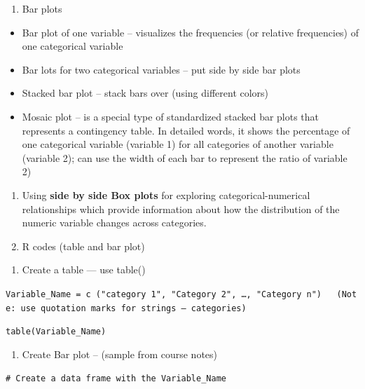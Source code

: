 \documentclass[
]{book}
\providecommand{\tightlist}{%
  \setlength{\itemsep}{0pt}\setlength{\parskip}{0pt}}
\begin{document}
\begin{enumerate}
\def\labelenumi{\arabic{enumi}.}
\setcounter{enumi}{1}
\tightlist
\item
  Bar plots
\end{enumerate}

\begin{itemize}
\tightlist
\item
  Bar plot of one variable -- visualizes the frequencies (or relative frequencies) of one categorical variable
\item
  Bar lots for two categorical variables -- put side by side bar plots
\item
  Stacked bar plot -- stack bars over (using different colors)
\item
  Mosaic plot -- is a special type of standardized stacked bar plots that represents a contingency table. In detailed words, it shows the percentage of one categorical variable (variable 1) for all categories of another variable (variable 2); can use the width of each bar to represent the ratio of variable 2)
\end{itemize}

\begin{enumerate}
\def\labelenumi{\arabic{enumi}.}
\setcounter{enumi}{2}
\item
  Using \textbf{side by side Box plots} for exploring categorical-numerical relationships which provide information about how the distribution of the numeric variable changes across categories.
\item
  R codes (table and bar plot)
\end{enumerate}

\begin{enumerate}
\def\labelenumi{\arabic{enumi})}
\tightlist
\item
  Create a table --- use table()
\end{enumerate}

\texttt{Variable\_Name\ =\ c\ ("category\ 1",\ "Category\ 2",\ …,\ "Category\ n")\ \ \ (Note:\ use\ quotation\ marks\ for\ strings\ –\ categories)}

\texttt{table(Variable\_Name)}

\begin{enumerate}
\def\labelenumi{\arabic{enumi})}
\setcounter{enumi}{1}
\tightlist
\item
  Create Bar plot -- (sample from course notes)
\end{enumerate}

\texttt{\#\ Create\ a\ data\ frame\ with\ the\ Variable\_Name}
\end{document}
